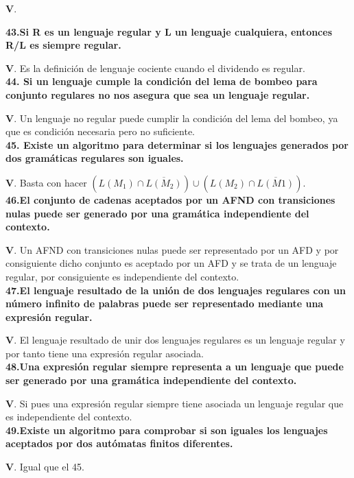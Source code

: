 \documentclass[a4paper,11pt]{article}
\begin{document}
\textbf{V}.

\textbf{43.Si R es un lenguaje regular y L un lenguaje cualquiera, entonces R/L es siempre regular.}

\textbf{V}. Es la definición de lenguaje cociente cuando el dividendo es regular. \\

\textbf{44. Si un lenguaje cumple la condición del lema de bombeo para conjunto regulares no nos asegura que sea un lenguaje regular.}

\textbf{V}. Un lenguaje no regular puede cumplir la condición del lema del bombeo, ya que es condición necesaria pero no suficiente. \\

\textbf{45. Existe un algoritmo para determinar si los lenguajes generados por dos gramáticas regulares son iguales.}

\textbf{V}. Basta con hacer $(L(M_1)\cap \overline{L(M_2)})\cup(L(M_2)\cap \overline{L(M1)})$. \\

\textbf{46.El conjunto de cadenas aceptados por un AFND con transiciones nulas puede ser generado por una gramática independiente del contexto.}

\textbf{V}. Un AFND con transiciones nulas puede ser representado por un AFD y por consiguiente dicho conjunto es aceptado por un AFD y se trata de un lenguaje regular, por consiguiente es independiente del contexto. \\

\textbf{47.El lenguaje resultado de la unión de dos lenguajes regulares con un número infinito de palabras puede ser representado mediante una expresión regular.}

\textbf{V}. El lenguaje resultado de unir dos lenguajes regulares es un lenguaje regular y por tanto tiene una expresión regular asociada. \\

\textbf{48.Una expresión regular siempre representa a un lenguaje que puede ser generado por una gramática independiente del contexto.}

\textbf{V}. Si pues una expresión regular siempre tiene asociada un lenguaje regular que es independiente del contexto. \\

\textbf{49.Existe un algoritmo para comprobar si son iguales los lenguajes aceptados por dos autómatas finitos diferentes.}

\textbf{V}. Igual que el 45. \\
\end{document}
